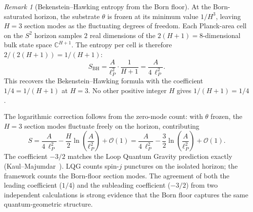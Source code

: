 \documentclass[11pt,a4paper]{article}
\theoremstyle{definition}
\theoremstyle{remark}
\newtheorem{remark}[theorem]{Remark}
\newcommand{\C}{\mathbb{C}}
\begin{document}
\begin{remark}[Bekenstein--Hawking entropy from the Born floor]\label{rem:bekenstein_hawking}
At the Born-saturated horizon, the substrate $\theta$ is frozen at its minimum value $1/H^3$, leaving $H=3$ section modes as the fluctuating degrees of freedom. Each Planck-area cell on the $S^2$ horizon samples $2$ real dimensions of the $2(H+1)=8$-dimensional bulk state space $\C^{H+1}$. The entropy per cell is therefore $2/(2(H+1))=1/(H+1)$:
\begin{equation}\label{eq:bh_entropy}
S_{\mathrm{BH}}=\frac{A}{\ell_P^2}\cdot\frac{1}{H+1}=\frac{A}{4\,\ell_P^2}.
\end{equation}
This recovers the Bekenstein--Hawking formula with the coefficient $1/4=1/(H+1)$ at $H=3$. No other positive integer $H$ gives $1/(H+1)=1/4$.

The logarithmic correction follows from the zero-mode count: with $\theta$ frozen, the $H=3$ section modes fluctuate freely on the horizon, contributing
\begin{equation}\label{eq:bh_log_correction}
S=\frac{A}{4\,\ell_P^2}-\frac{H}{2}\ln\!\left(\frac{A}{\ell_P^2}\right)+\mathcal{O}(1)=\frac{A}{4\,\ell_P^2}-\frac{3}{2}\ln\!\left(\frac{A}{\ell_P^2}\right)+\mathcal{O}(1).
\end{equation}
The coefficient $-3/2$ matches the Loop Quantum Gravity prediction exactly (Kaul--Majumdar~\cite{KM2000}). LQG counts spin-$j$ punctures on the isolated horizon; the framework counts the Born-floor section modes. The agreement of both the leading coefficient ($1/4$) and the subleading coefficient ($-3/2$) from two independent calculations is strong evidence that the Born floor captures the same quantum-geometric structure.
\end{remark}
\end{document}
